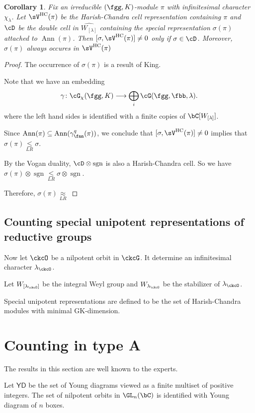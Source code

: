 \documentclass[12pt,a4paper]{amsart}
\DeclareMathOperator{\Ann}{Ann}
\newcommand{\sgn}{\operatorname{sgn}}
\numberwithin{equation}{section}
\newtheorem{cor}[thm]{Corollary}
\theoremstyle{remark}
\def\YD{\mathsf{YD}}
\def\lamck{\lambda_\ckcO}
\def\WLamck{W_{[\lambda_{\ckcO}]}}
\def\Wlamck{W_{\lamck}}
\def\leqLR{\mathrel{\mathop{\leq}\limits_{\scriptscriptstyle LR}}}
\def\approxLR{\mathrel{\mathop{\approx}\limits_{\scriptscriptstyle LR}}}
\begin{document}
\def\VHC{\sV^{\mathrm{HC}}}
\begin{cor}
  Fix an irreducible $(\fgg,K)$-module $\pi$ with infinitesimal character
  $\chi_{\lambda}$. Let $\VHC(\pi)$ be the Harish-Chandra cell representation
  containing $\pi$ and $\cD$ be the double cell in $\widehat{W_{[\lambda]}}$
  containing the special representation $\sigma(\pi)$attached to $\Ann(\pi)$.
  Then $[\sigma, \VHC(\pi)]\neq 0$ only if $\sigma \in \cD$.
  Moreover, $\sigma(\pi)$ always occures in $\VHC(\pi)$
\end{cor}
\begin{proof}
  The occurrence of $\sigma(\pi)$ is a result of King.

  Note that we have an embedding
  \[
    \gamma \colon \Grt_{\chi}(\fgg,K)\longrightarrow \bigoplus_{i}\Grt(\fgg,\fbb,\lambda).
  \]
  where the left hand sides is identified with a finite copies of
  $\bC[W_{[\lambda]}]$.

  Since $\Ann(\pi)\subseteq \Ann (\gamma_{\fnn}^{q}(\pi))$,
  we conclude that $[\sigma, \VHC(\pi)]\neq 0$ implies that
  $\sigma(\pi)\leqLR \sigma$.

  By the Vogan duality, $\cD\otimes \sgn$ is also a Harish-Chandra cell.
  So we have $\sigma(\pi)\otimes \sgn \leqLR \sigma\otimes \sgn$.

  Therefore, $\sigma(\pi)\approxLR$
\end{proof}




\subsection{Counting special unipotent representations of reductive groups}

Now let $\ckcO$ be a nilpotent orbit in $\ckcG$.
It determine an infinitesimal character $\lamck$.

Let $\WLamck$ be the integral Weyl group and $\Wlamck$ be the stabilizer of
$\lamck$.

Special unipotent representations are defined to be the set of
Harish-Chandra modules with minimal GK-dimension.

\section{Counting in type A}
The results in this section are well known to the experts.


Let $\YD$ be the set of Young diagrams viewed as a finite multiset of positive integers. 
The set of nilpotent orbits in $\GL_n(\bC)$ is identified with Young diagram of $n$ boxes.
\end{document}
